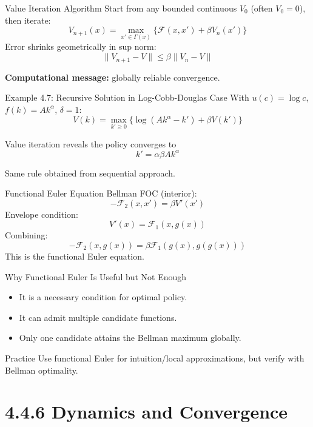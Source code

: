 \documentclass[aspectratio=169,10pt]{beamer}
\newcommand{\apxbutton}[1]{\hfill\hyperlink{#1}{\beamerbutton{Appendix}}}
\begin{document}
\begin{frame}{Value Iteration Algorithm}
\hypertarget{m-a8}{}
Start from any bounded continuous $V_0$ (often $V_0=0$), then iterate:
\[
V_{n+1}(x)=\max_{x'\in\Gamma(x)}\{\mathcal{F}(x,x')+\beta V_n(x')\}
\]
Error shrinks geometrically in sup norm:
\[
\|V_{n+1}-V\|\le\beta\|V_n-V\|
\]

\textbf{Computational message:} globally reliable convergence.
\apxbutton{a8}
\end{frame}

\begin{frame}{Example 4.7: Recursive Solution in Log-Cobb-Douglas Case}
With $u(c)=\log c$, $f(k)=Ak^\alpha$, $\delta=1$:
\[
V(k)=\max_{k'\ge 0}\{\log(Ak^\alpha-k')+\beta V(k')\}
\]

Value iteration reveals the policy converges to
\[
k'=\alpha\beta Ak^\alpha
\]

Same rule obtained from sequential approach.
\end{frame}

\begin{frame}{Functional Euler Equation}
\hypertarget{m-a9}{}
Bellman FOC (interior):
\[
-\mathcal{F}_2(x,x')=\beta V'(x')
\]
Envelope condition:
\[
V'(x)=\mathcal{F}_1(x,g(x))
\]
Combining:
\[
-\mathcal{F}_2(x,g(x))=\beta\mathcal{F}_1(g(x),g(g(x)))
\]
This is the functional Euler equation.
\apxbutton{a9}
\end{frame}

\begin{frame}{Why Functional Euler Is Useful but Not Enough}
\begin{itemize}
  \item It is a necessary condition for optimal policy.
  \item It can admit multiple candidate functions.
  \item Only one candidate attains the Bellman maximum globally.
\end{itemize}

\begin{block}{Practice}
Use functional Euler for intuition/local approximations, but verify with Bellman optimality.
\end{block}
\end{frame}

\section{4.4.6 Dynamics and Convergence}
\end{document}
